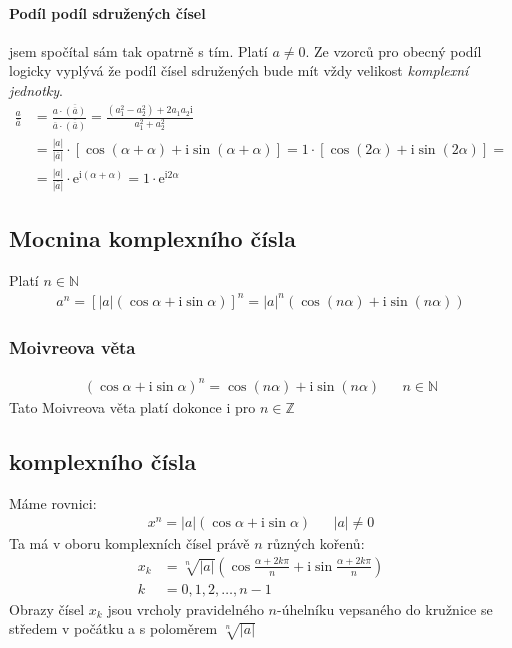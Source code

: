 \documentclass[12pt]{article}
\providecommand{\abs}[1]{\lvert#1\rvert}
\newcommand{\euler}{\mathrm{e}} %
\newcommand{\iu}{\mathrm{i}} %
\newcommand{\nN}{\mathbb{N}} %
\newcommand{\nZ}{\mathbb{Z}} %
\begin{document}
\paragraph{Podíl podíl sdružených čísel} jsem spočítal sám tak opatrně s tím. Platí $a \neq 0$. Ze vzorců pro obecný podíl logicky vyplývá že podíl čísel sdružených bude mít vždy velikost \emph{komplexní jednotky}.
\begin{align}
\frac{a}{\overline{a}} &= \frac{a \cdot \overline{(\overline{a})}}{\overline{a} \cdot \overline{(\overline{a})}} = \frac{(a_1^2 - a_2^2) + 2 a_1 a_2 \iu }{a_1^2 + a_2^2} \\
&= \frac{\abs{a}}{\abs{\overline{a}}} \cdot [ \cos (\alpha + \alpha) + \iu \sin ( \alpha + \alpha )] = 	1 \cdot [ \cos (2 \alpha) + \iu \sin ( 2\alpha )] =\\
 &= \frac{\abs{a}}{\abs{\overline{a}}} \cdot \euler^{\iu ( \alpha + \alpha )} = 1 \cdot \euler^{\iu 2 \alpha}
\end{align}
\subsection{Mocnina komplexního čísla}
Platí $n \in \nN$
\begin{align}
a^n = \left[ \abs{a}(\cos \alpha + \iu \sin \alpha ) \right]^n = \abs{a}^n \left( \cos (n \alpha ) + \iu \sin ( n \alpha ) \right)
\end{align}
\subsubsection{Moivreova věta}
\begin{align}
 \left( \cos \alpha + \iu \sin \alpha \right)^n = \cos (n \alpha ) + \iu \sin (n \alpha ) && n \in \nN
\end{align}
Tato Moivreova věta platí dokonce i pro $ n \in  \nZ$
\subsection{ komplexního čísla}
Máme rovnici:
\begin{align}
x^n = \abs{a} (\cos \alpha + \iu \sin \alpha ) && \abs{a} \neq 0
\end{align}
Ta má v oboru komplexních čísel právě $n$ různých kořenů:
\begin{align}
x_k &= \sqrt[n]{\abs{a}} \left( \cos \frac{\alpha + 2k\pi}{n} + \iu \sin \frac{\alpha + 2k\pi}{n} \right) \\
k &= 0,1,2, \dotsc, n-1
\end{align}
Obrazy čísel $x_k$ jsou vrcholy pravidelného $n$-úhelníku vepsaného do kružnice se středem v počátku a s poloměrem $\sqrt[n]{\abs{a}}$
\end{document}

